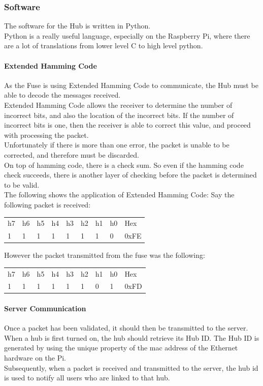 \documentclass[draft,preprint,12pt,3p]{elsarticle}
\begin{document}
\subsubsection{Software}
The software for the Hub is written in Python.\\
Python is a really useful language, especially on the Raspberry Pi, where there are a lot of translations from lower level C to high level python.\\
\paragraph{Extended Hamming Code}
As the Fuse is using Extended Hamming Code to communicate, the Hub must be able to decode the messages received.\\
Extended Hamming Code allows the receiver to determine the number of incorrect bits, and also the location of the incorrect bits. If the number of incorrect bits is one, then the receiver is able to correct this value, and proceed with processing the packet.\\
Unfortunately if there is more than one error, the packet is unable to be corrected, and therefore must be discarded.\\
On top of hamming code, there is a check sum. So even if the hamming code check succeeds, there is another layer of checking before the packet is determined to be valid.\\
The following shows the application of Extended Hamming Code:
Say the following packet is received:
\begin{table}[H]
\centering
\begin{tabular}{| l | l | l | l | l | l | l | l | l |}
h7 & h6 & h5 & h4 & h3 & h2 & h1 & h0 & Hex\\
1 & 1 & 1 & 1 & 1 & 1 & 1 & 0 & 0xFE 
\end{tabular}
\label{tab:my_label}
\end{table}

However the packet transmitted from the fuse was the following:
\begin{table}[H]
\centering
\begin{tabular}{| l | l | l | l | l | l | l | l | l |}
h7 & h6 & h5 & h4 & h3 & h2 & h1 & h0 & Hex\\
1 & 1 & 1 & 1 & 1 & 1 & 0 & 1  & 0xFD
\end{tabular}
\label{tab:my_label}
\end{table}

\paragraph{Server Communication}
Once a packet has been validated, it should then be transmitted to the server.\\
When a hub is first turned on, the hub should retrieve its Hub ID. The Hub ID is generated by using the unique property of the mac address of the Ethernet hardware on the Pi.\\
Subsequently, when a packet is received and transmitted to the server, the hub id is used to notify all users who are linked to that hub.
\end{document}
